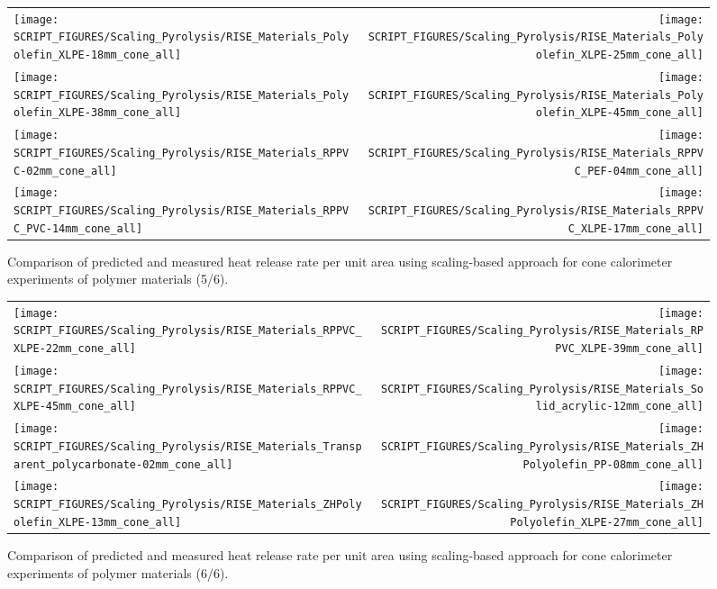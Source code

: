 \begin{figure}[!h]
\begin{tabular*}{\textwidth}{l@{\extracolsep{\fill}}r}
\texttt{[image: SCRIPT\_FIGURES/Scaling\_Pyrolysis/RISE\_Materials\_Polyolefin\_XLPE-18mm\_cone\_all]} &
\texttt{[image: SCRIPT\_FIGURES/Scaling\_Pyrolysis/RISE\_Materials\_Polyolefin\_XLPE-25mm\_cone\_all]} \\
\texttt{[image: SCRIPT\_FIGURES/Scaling\_Pyrolysis/RISE\_Materials\_Polyolefin\_XLPE-38mm\_cone\_all]} &
\texttt{[image: SCRIPT\_FIGURES/Scaling\_Pyrolysis/RISE\_Materials\_Polyolefin\_XLPE-45mm\_cone\_all]} \\
\texttt{[image: SCRIPT\_FIGURES/Scaling\_Pyrolysis/RISE\_Materials\_RPPVC-02mm\_cone\_all]} &
\texttt{[image: SCRIPT\_FIGURES/Scaling\_Pyrolysis/RISE\_Materials\_RPPVC\_PEF-04mm\_cone\_all]} \\
\texttt{[image: SCRIPT\_FIGURES/Scaling\_Pyrolysis/RISE\_Materials\_RPPVC\_PVC-14mm\_cone\_all]} &
\texttt{[image: SCRIPT\_FIGURES/Scaling\_Pyrolysis/RISE\_Materials\_RPPVC\_XLPE-17mm\_cone\_all]} \\
\end{tabular*}
\caption[Heat release rate per unit area of RISE materials using scaling model, polymer materials]
{Comparison of predicted and measured heat release rate per unit area using scaling-based approach for cone calorimeter experiments of polymer materials (5/6).}
\label{RISE_Materials_polymers5}
\end{figure}

\begin{figure}[!h]
\begin{tabular*}{\textwidth}{l@{\extracolsep{\fill}}r}
\texttt{[image: SCRIPT\_FIGURES/Scaling\_Pyrolysis/RISE\_Materials\_RPPVC\_XLPE-22mm\_cone\_all]} &
\texttt{[image: SCRIPT\_FIGURES/Scaling\_Pyrolysis/RISE\_Materials\_RPPVC\_XLPE-39mm\_cone\_all]} \\
\texttt{[image: SCRIPT\_FIGURES/Scaling\_Pyrolysis/RISE\_Materials\_RPPVC\_XLPE-45mm\_cone\_all]} &
\texttt{[image: SCRIPT\_FIGURES/Scaling\_Pyrolysis/RISE\_Materials\_Solid\_acrylic-12mm\_cone\_all]} \\
\texttt{[image: SCRIPT\_FIGURES/Scaling\_Pyrolysis/RISE\_Materials\_Transparent\_polycarbonate-02mm\_cone\_all]} &
\texttt{[image: SCRIPT\_FIGURES/Scaling\_Pyrolysis/RISE\_Materials\_ZHPolyolefin\_PP-08mm\_cone\_all]} \\
\texttt{[image: SCRIPT\_FIGURES/Scaling\_Pyrolysis/RISE\_Materials\_ZHPolyolefin\_XLPE-13mm\_cone\_all]} &
\texttt{[image: SCRIPT\_FIGURES/Scaling\_Pyrolysis/RISE\_Materials\_ZHPolyolefin\_XLPE-27mm\_cone\_all]} \\
\end{tabular*}
\caption[Heat release rate per unit area of RISE materials using scaling model, polymer materials]
{Comparison of predicted and measured heat release rate per unit area using scaling-based approach for cone calorimeter experiments of polymer materials (6/6).}
\label{RISE_Materials_polymers6}
\end{figure}

